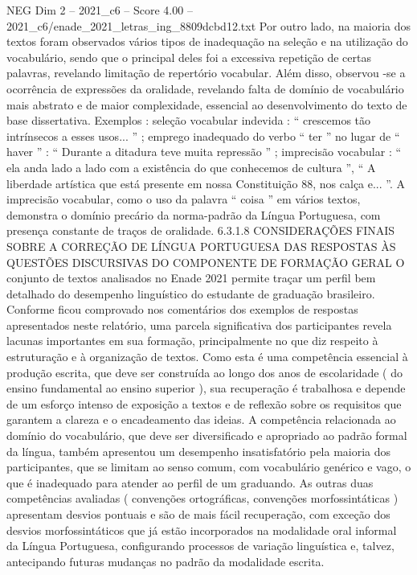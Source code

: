 \begin{textsample}{NEG Dim 2 – 2021\_c6 – Score 4.00 – 2021\_c6/enade\_2021\_letras\_ing\_8809dcbd12.txt}
Por outro lado, na maioria dos textos foram observados vários tipos de inadequação na seleção e na utilização do vocabulário, sendo que o principal deles foi a excessiva repetição de certas palavras, revelando limitação de repertório vocabular.
Além disso, observou -se a ocorrência de expressões da oralidade, revelando falta de domínio de vocabulário mais abstrato e de maior complexidade, essencial ao desenvolvimento do texto de base dissertativa.
Exemplos : seleção vocabular indevida : “ crescemos tão intrínsecos a esses usos... ” ; emprego inadequado do verbo “ ter ” no lugar de “ haver ” : “ Durante a ditadura teve muita repressão ” ; imprecisão vocabular : “ ela anda lado a lado com a existência do que conhecemos de cultura ”, “ A liberdade artística que está presente em nossa Constituição 88, nos calça e... ”.
A imprecisão vocabular, como o uso da palavra “ coisa ” em vários textos, demonstra o domínio precário da norma-padrão da Língua Portuguesa, com presença constante de traços de oralidade. 6.3.1.8 CONSIDERAÇÕES FINAIS SOBRE A CORREÇÃO DE LÍNGUA PORTUGUESA DAS RESPOSTAS ÀS QUESTÕES DISCURSIVAS DO COMPONENTE DE FORMAÇÃO GERAL O conjunto de textos analisados no Enade 2021 permite traçar um perfil bem detalhado do desempenho linguístico do estudante de graduação brasileiro.
Conforme ficou comprovado nos comentários dos exemplos de respostas apresentados neste relatório, uma parcela significativa dos participantes revela lacunas importantes em sua formação, principalmente no que diz respeito à estruturação e à organização de textos.
Como esta é uma competência essencial à produção escrita, que deve ser construída ao longo dos anos de escolaridade ( do ensino fundamental ao ensino superior ), sua recuperação é trabalhosa e depende de um esforço intenso de exposição a textos e de reflexão sobre os requisitos que garantem a clareza e o encadeamento das ideias.
A competência relacionada ao domínio do vocabulário, que deve ser diversificado e apropriado ao padrão formal da língua, também apresentou um desempenho insatisfatório pela maioria dos participantes, que se limitam ao senso comum, com vocabulário genérico e vago, o que é inadequado para atender ao perfil de um graduando.
As outras duas competências avaliadas ( convenções ortográficas, convenções morfossintáticas ) apresentam desvios pontuais e são de mais fácil recuperação, com exceção dos desvios morfossintáticos que já estão incorporados na modalidade oral informal da Língua Portuguesa, configurando processos de variação linguística e, talvez, antecipando futuras mudanças no padrão da modalidade escrita.

\end{textsample}
